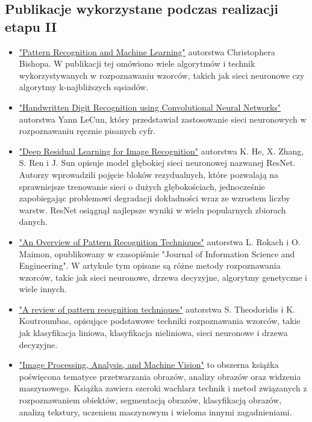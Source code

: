 \documentclass[a4paper, titleauthor]{mwart}
\begin{document}
\subsection{Publikacje wykorzystane podczas realizacji etapu II}

\begin{itemize}\setlength{\itemsep}{0.2\baselineskip}
    \item \href{https://www.microsoft.com/en-us/research/uploads/prod/2006/01/Bishop-Pattern-Recognition-and-Machine-Learning-2006.pdf}{"Pattern Recognition and Machine Learning"} autorstwa Christophera Bishopa. W publikacji tej omówiono wiele algorytmów i technik wykorzystywanych w rozpoznawaniu wzorców, takich jak sieci neuronowe czy algorytmy k-najbliższych sąsiadów. 
\newline
    \item \href{https://www.irjet.net/archives/V4/i7/IRJET-V4I7599.pdf}{"Handwritten Digit Recognition using Convolutional Neural Networks"} autorstwa Yann LeCun, który przedstawiał zastosowanie sieci neuronowych w rozpoznawaniu ręcznie pisanych cyfr.
\newline
	\item \href{https://arxiv.org/pdf/1512.03385.pdf}{"Deep Residual Learning for Image Recognition"} autorstwa K. He, X. Zhang, S. Ren i J. Sun opisuje model głębokiej sieci neuronowej nazwanej ResNet. Autorzy wprowadzili pojęcie bloków rezydualnych, które pozwalają na sprawniejsze trenowanie sieci o dużych głębokościach, jednocześnie zapobiegając problemowi degradacji dokładności wraz ze wzrostem liczby warstw. ResNet osiągnął najlepsze wyniki w wielu popularnych zbiorach danych.
\newline
    \item \href{https://www.researchgate.net/publication/220651964_An_Overview_of_Pattern_Recognition_Techniques}{"An Overview of Pattern Recognition Techniques"} autorstwa L. Rokach i O. Maimon, opublikowany w czasopiśmie "Journal of Information Science and Engineering". W artykule tym opisane są różne metody rozpoznawania wzorców, takie jak sieci neuronowe, drzewa decyzyjne, algorytmy genetyczne i wiele innych.
\newline
    \item \href{https://darmanto.akakom.ac.id/pengenalanpola/Pattern%20Recognition%204th%20Ed.%20(2009).pdf}{"A review of pattern recognition techniques"} autorstwa S. Theodoridis i K. Koutroumbas, opisujące podstawowe techniki rozpoznawania wzorców, takie jak klasyfikacja liniowa, klasyfikacja nieliniowa, sieci neuronowe i drzewa decyzyjne.
\newline
    \item \href{https://kgut.ac.ir/useruploads/1550563201478ety.pdf}{"Image Processing, Analysis, and Machine Vision"} to obszerna książka poświęcona tematyce przetwarzania obrazów, analizy obrazów oraz widzenia maszynowego. Książka zawiera szeroki wachlarz technik i metod związanych z rozpoznawaniem obiektów, segmentacją obrazów, klasyfikacją obrazów, analizą tekstury, uczeniem maszynowym i wieloma innymi zagadnieniami.
 
\end{itemize}
\end{document}
